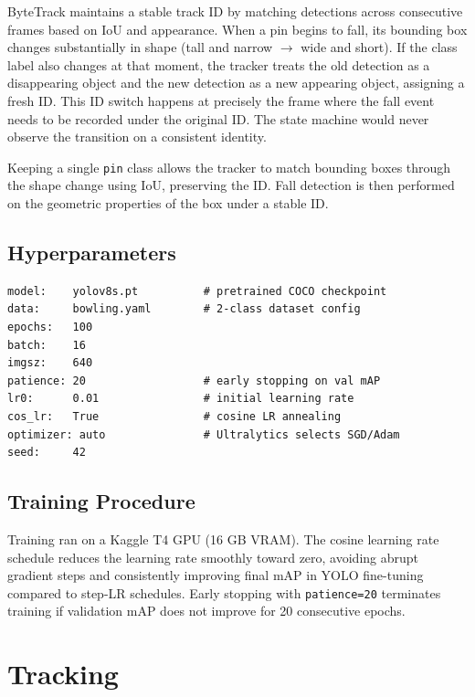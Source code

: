 \documentclass[11pt,a4paper]{article}
\begin{document}
ByteTrack maintains a stable track ID by matching detections across consecutive frames based on IoU and appearance. When a pin begins to fall, its bounding box changes substantially in shape (tall and narrow $\to$ wide and short). If the class label also changes at that moment, the tracker treats the old detection as a disappearing object and the new detection as a new appearing object, assigning a fresh ID. This ID switch happens at precisely the frame where the fall event needs to be recorded under the original ID. The state machine would never observe the transition on a consistent identity.

Keeping a single \texttt{pin} class allows the tracker to match bounding boxes through the shape change using IoU, preserving the ID. Fall detection is then performed on the geometric properties of the box under a stable ID.

\subsection{Hyperparameters}
\label{sec:hyperparams}

\begin{lstlisting}[style=config, caption={Key training hyperparameters passed to \texttt{model.train()}.}, label={lst:hparams}]
model:    yolov8s.pt          # pretrained COCO checkpoint
data:     bowling.yaml        # 2-class dataset config
epochs:   100
batch:    16
imgsz:    640
patience: 20                  # early stopping on val mAP
lr0:      0.01                # initial learning rate
cos_lr:   True                # cosine LR annealing
optimizer: auto               # Ultralytics selects SGD/Adam
seed:     42
\end{lstlisting}

\subsection{Training Procedure}

Training ran on a Kaggle T4 GPU (16 GB VRAM). The cosine learning rate schedule reduces the learning rate smoothly toward zero, avoiding abrupt gradient steps and consistently improving final mAP in YOLO fine-tuning compared to step-LR schedules. Early stopping with \texttt{patience=20} terminates training if validation mAP does not improve for 20 consecutive epochs.

\section{Tracking}
\end{document}
